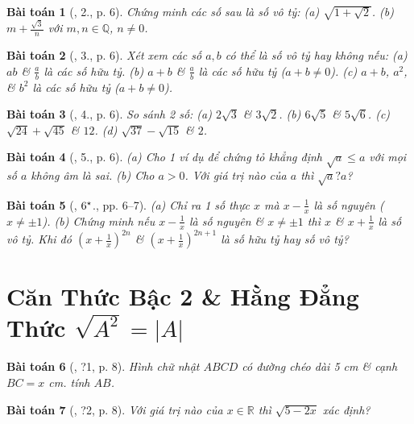 \documentclass{article}
\newtheorem{baitoan}{Bài toán}
\begin{document}
\begin{baitoan}[\cite{Binh_Toan_9_tap_1}, 2., p. 6]
	Chứng minh các số sau là số vô tỷ: (a) $\sqrt{1 + \sqrt{2}}$. (b) $m + \frac{\sqrt{3}}{n}$ với $m,n\in\mathbb{Q}$, $n\ne0$.
\end{baitoan}

\begin{baitoan}[\cite{Binh_Toan_9_tap_1}, 3., p. 6]
	Xét xem các số $a,b$ có thể là số vô tỷ hay không nếu: (a) $ab$ \& $\frac{a}{b}$ là các số hữu tỷ. (b) $a + b$ \& $\frac{a}{b}$ là các số hữu tỷ ($a + b\ne0$). (c) $a + b$, $a^2$, \& $b^2$ là các số hữu tỷ ($a + b\ne0$).
\end{baitoan}

\begin{baitoan}[\cite{Binh_Toan_9_tap_1}, 4., p. 6]
	So sánh 2 số: (a) $2\sqrt{3}$ \& $3\sqrt{2}$. (b) $6\sqrt{5}$ \& $5\sqrt{6}$. (c) $\sqrt{24} + \sqrt{45}$ \& $12$. (d) $\sqrt{37} - \sqrt{15}$ \& $2$.
\end{baitoan}

\begin{baitoan}[\cite{Binh_Toan_9_tap_1}, 5., p. 6]
	(a) Cho 1 ví dụ để chứng tỏ khẳng định $\sqrt{a}\le a$ với mọi số $a$ không âm là sai. (b) Cho $a > 0$. Với giá trị nào của $a$ thì $\sqrt{a} ? a$?
\end{baitoan}

\begin{baitoan}[\cite{Binh_Toan_9_tap_1}, $\rm6^\star$., pp. 6--7]
	(a) Chỉ ra 1 số thực $x$ mà $x - \frac{1}{x}$ là số nguyên ($x\ne\pm1$). (b) Chứng minh nếu $x - \frac{1}{x}$ là số nguyên \& $x\ne\pm1$ thì $x$ \& $x + \frac{1}{x}$ là số vô tỷ. Khi đó $\left(x + \frac{1}{x}\right)^{2n}$ \& $\left(x + \frac{1}{x}\right)^{2n+1}$ là số hữu tỷ hay số vô tỷ?
\end{baitoan}


\section{Căn Thức Bậc 2 \& Hằng Đẳng Thức $\sqrt{A^2} = |A|$}

\begin{baitoan}[\cite{SGK_Toan_9_tap_1}, ?1, p. 8]
	Hình chữ nhật $ABCD$ có đường chéo dài \emph{5 cm} \& cạnh $BC =  x$ \emph{cm}. tính $AB$.
\end{baitoan}

\begin{baitoan}[\cite{SGK_Toan_9_tap_1}, ?2, p. 8]
	Với giá trị nào của $x\in\mathbb{R}$ thì $\sqrt{5 - 2x}$ xác định?
\end{baitoan}
\end{document}
